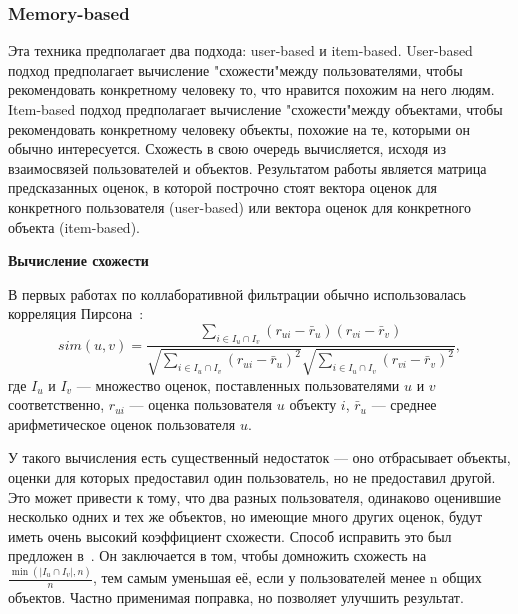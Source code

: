 \subsubsection{Memory-based}\label{subsubsec:memory-based}
Эта техника предполагает два подхода: user-based и item-based.
User-based подход предполагает вычисление "схожести"\space между пользователями, чтобы рекомендовать конкретному человеку то, что нравится похожим на него людям.
Item-based подход предполагает вычисление "схожести"\space между объектами, чтобы рекомендовать конкретному человеку объекты, похожие на те, которыми он обычно интересуется.
Схожесть в свою очередь вычисляется, исходя из взаимосвязей пользователей и объектов.
Результатом работы является матрица предсказанных оценок, в которой построчно стоят вектора оценок для конкретного пользователя (user-based) или вектора оценок для конкретного объекта (item-based).

\vspace{1em}
\textbf{Вычисление схожести}

В первых работах по коллаборативной фильтрации обычно использовалась корреляция Пирсона~\cite{resnick}:
\begin{equation}\label{eq:pearson}
    sim(u, v) = \frac
    {\sum_{i\in I_u\cap I_v}{(r_{ui} - \bar r_u)(r_{vi} - \bar r_v)}}
    {\sqrt{\sum_{i \in I_u \cap I_v}{(r_{ui} - \bar r_u)^2}}
    \sqrt{\sum_{i \in I_u \cap I_v}{(r_{vi} - \bar r_v)^2}}},
\end{equation}
где $I_u$ и $I_v$ --- множество оценок, поставленных пользователями $u$ и $v$ соответственно,
$r_{ui}$ --- оценка пользователя $u$ объекту $i$,
$\bar r_u$ --- среднее арифметическое оценок пользователя $u$.

У такого вычисления есть существенный недостаток --- оно отбрасывает объекты, оценки для которых предоставил один пользователь, но не предоставил другой.
Это может привести к тому, что два разных пользователя, одинаково оценившие несколько одних и тех же объектов, но имеющие много других оценок, будут иметь очень высокий коэффициент схожести.
Способ исправить это был предложен в~\cite{herlocker}.
Он заключается в том, чтобы домножить схожесть на $\frac{\min(\mid I_u \cap I_v\mid, n)}{n}$, тем самым уменьшая её, если у пользователей менее n общих объектов.
Частно применимая поправка, но позволяет улучшить результат.


